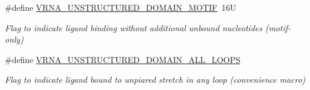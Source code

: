\begin{DoxyCompactItemize}
\mbox{\label{group__domains__up_gaab12b58d59be76446a9f76fad2fe624c}} 
\#define \hyperlink{group__domains__up_gaab12b58d59be76446a9f76fad2fe624c}{V\+R\+N\+A\+\_\+\+U\+N\+S\+T\+R\+U\+C\+T\+U\+R\+E\+D\+\_\+\+D\+O\+M\+A\+I\+N\+\_\+\+M\+O\+T\+IF}~16U
\begin{DoxyCompactList}\small\item\em Flag to indicate ligand binding without additional unbound nucleotides (motif-\/only) \end{DoxyCompactList}\item 
\mbox{\label{group__domains__up_ga3c6be4cce70f1af9e885788856101699}} 
\#define \hyperlink{group__domains__up_ga3c6be4cce70f1af9e885788856101699}{V\+R\+N\+A\+\_\+\+U\+N\+S\+T\+R\+U\+C\+T\+U\+R\+E\+D\+\_\+\+D\+O\+M\+A\+I\+N\+\_\+\+A\+L\+L\+\_\+\+L\+O\+O\+PS}
\begin{DoxyCompactList}\small\item\em Flag to indicate ligand bound to unpiared stretch in any loop (convenience macro) \end{DoxyCompactList}\end{DoxyCompactItemize}
